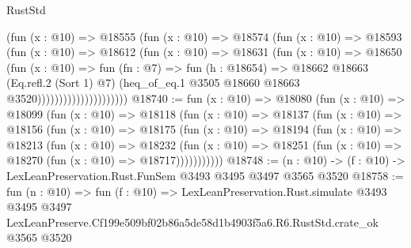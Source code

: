 \begin{lexlean}{RustStd}
\begin{coremodule}
                              (fun (x : @10) =>
                              @18555
                                (fun (x : @10) =>
                                @18574
                                  (fun (x : @10) =>
                                  @18593
                                    (fun (x : @10) =>
                                    @18612
                                      (fun (x : @10) =>
                                      @18631
                                        (fun (x : @10) =>
                                        @18650
                                          (fun (x : @10) =>
                                          fun (fn : @7) =>
                                          fun (h : @18654) =>
                                          @18662
                                            @18663
                                            (Eq.refl.{2} (Sort 1) @7)
                                            (heq_of_eq.{1}
                                              @3505
                                              @18660
                                              @18663
                                              @3520)))))))))))))))))))))
@18740 := fun (x : @10) =>
  @18080
    (fun (x : @10) =>
    @18099
      (fun (x : @10) =>
      @18118
        (fun (x : @10) =>
        @18137
          (fun (x : @10) =>
          @18156
            (fun (x : @10) =>
            @18175
              (fun (x : @10) =>
              @18194
                (fun (x : @10) =>
                @18213
                  (fun (x : @10) =>
                  @18232
                    (fun (x : @10) =>
                    @18251 (fun (x : @10) => @18270 (fun (x : @10) => @18717)))))))))))
@18748 := (n : @10) -> (f : @10) -> LexLeanPreservation.Rust.FunSem @3493 @3495 @3497 @3565 @3520
@18758 := fun (n : @10) =>
  fun (f : @10) =>
  LexLeanPreservation.Rust.simulate
    @3493
    @3495
    @3497
    LexLeanPreserve.Cf199e509bf02b86a5de58d1b4903f5a6.R6.RustStd.crate_ok
    @3565
    @3520
\end{coremodule}
\end{lexlean}
